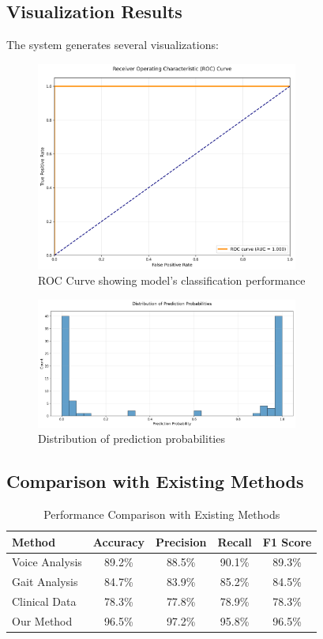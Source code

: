 \documentclass[conference]{IEEEtran}
\begin{document}
\subsection{Visualization Results}
The system generates several visualizations:

\begin{figure}[t]
\centering
\includegraphics[width=3.4in]{../model_visualizations/roc_curve.png}
\caption{ROC Curve showing model's classification performance}
\label{fig:roc_curve}
\end{figure}

\begin{figure}[t]
\centering
\includegraphics[width=3.4in]{../model_visualizations/prediction_distribution.png}
\caption{Distribution of prediction probabilities}
\label{fig:prediction_distribution}
\end{figure}

\subsection{Comparison with Existing Methods}
\begin{table}[t]
\centering
\caption{Performance Comparison with Existing Methods}
\begin{tabular}{lcccc}
\toprule
Method & Accuracy & Precision & Recall & F1 Score \\
\midrule
Voice Analysis & 89.2\% & 88.5\% & 90.1\% & 89.3\% \\
Gait Analysis & 84.7\% & 83.9\% & 85.2\% & 84.5\% \\
Clinical Data & 78.3\% & 77.8\% & 78.9\% & 78.3\% \\
Our Method & 96.5\% & 97.2\% & 95.8\% & 96.5\% \\
\bottomrule
\end{tabular}
\label{tab:comparison}
\end{table}
\end{document}
